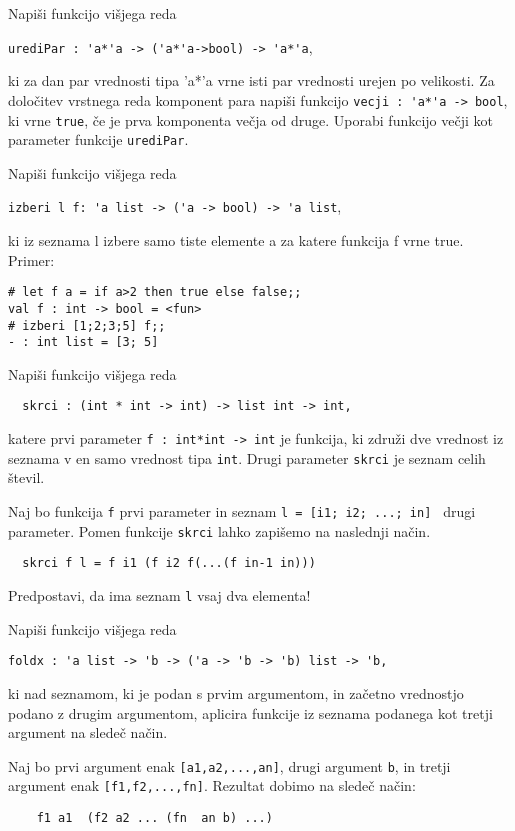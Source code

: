 \begin{ex}
Napi\v si funkcijo vi\v sjega reda 
\begin{center}
\lstinline{urediPar : 'a*'a -> ('a*'a->bool) -> 'a*'a}, 
\end{center}
ki za dan par vrednosti tipa 'a*'a vrne isti par vrednosti urejen po velikosti. Za dolo\v citev vrstnega reda komponent para napi\v si funkcijo 
\lstinline{vecji : 'a*'a -> bool}, 
ki vrne \lstinline{true}, \v ce je prva komponenta ve\v cja od druge. Uporabi funkcijo ve\v cji kot parameter funkcije \lstinline{urediPar}.

\end{ex}
\begin{ex}
Napi\v si funkcijo vi\v sjega reda 
\begin{center}
\lstinline{izberi l f: 'a list -> ('a -> bool) -> 'a list},
\end{center}
ki iz seznama l izbere samo
tiste elemente a za katere funkcija f vrne true.
Primer: 
\begin{lstlisting}
# let f a = if a>2 then true else false;;
val f : int -> bool = <fun>
# izberi [1;2;3;5] f;;
- : int list = [3; 5]
\end{lstlisting}
\end{ex}
\begin{ex}
  Napi\v si funkcijo vi\v sjega reda

\begin{lstlisting}
  skrci : (int * int -> int) -> list int -> int,
\end{lstlisting}
  katere prvi parameter \lstinline{f : int*int -> int} je funkcija, ki
  zdru\v zi dve vrednost iz seznama v en samo vrednost tipa
  \lstinline{int}. Drugi parameter \lstinline{skrci} je seznam celih \v
  stevil.

  Naj bo funkcija \lstinline{f} prvi parameter in seznam \lstinline{l = [i1; i2; ...; in] } drugi parameter. Pomen funkcije \lstinline{skrci}
  lahko zapi\v semo na naslednji na\v cin.

\begin{lstlisting}
  skrci f l = f i1 (f i2 f(...(f in-1 in)))
\end{lstlisting}
  Predpostavi, da ima seznam \lstinline{l} vsaj dva elementa!


\end{ex}
\begin{ex}
Napi\v si funkcijo vi\v sjega reda 

\begin{lstlisting}
foldx : 'a list -> 'b -> ('a -> 'b -> 'b) list -> 'b,
\end{lstlisting}
ki nad seznamom, ki je podan s prvim argumentom, in za\v cetno vrednostjo podano z drugim argumentom, aplicira funkcije iz seznama podanega kot tretji argument na slede\v c na\v cin. 

Naj bo prvi argument enak \lstinline{[a1,a2,...,an]},
drugi argument \lstinline{b}, in tretji argument enak
\lstinline{[f1,f2,...,fn]}. 
Rezultat dobimo na slede\v c na\v cin: 
\begin{lstlisting}
    f1 a1  (f2 a2 ... (fn  an b) ...)
\end{lstlisting}


\end{ex} 

